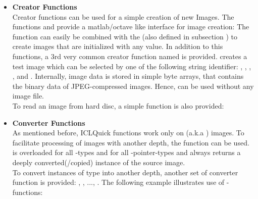 \begin{itemize}
\item \textbf{Creator Functions}\\
Creator functions can be used for a simple creation of new Images. The functions  and  provide a matlab/octave like interface for image creation:
The  function can easily be combined with the (also defined in subsection ) to create images that are initialized with any value.
In addition to this functions, a 3rd very common creator function named  is provided.  creates a test image which can be selected by one of the following string identifier: , , , ,  and .
Internally, image data is stored in simple byte arrays, that contains the binary data of JPEG-compressed images. Hence,  can be used without any image file.\\
To read an image from hard disc, a simple  function is also provided:

\item \textbf{Converter Functions}\\
As mentioned before, ICLQuick functions work only on  (a.k.a ) images. To facilitate processing of images with another depth, the  function can be used.  is overloaded for all -types and for all -pointer-types and always returns a deeply converted(/copied) instance of the source image.\\
To convert instances of type  into another depth, another set of converter function is provided: , , ..., . The following example illustrates use of -functions:




\end{itemize}
